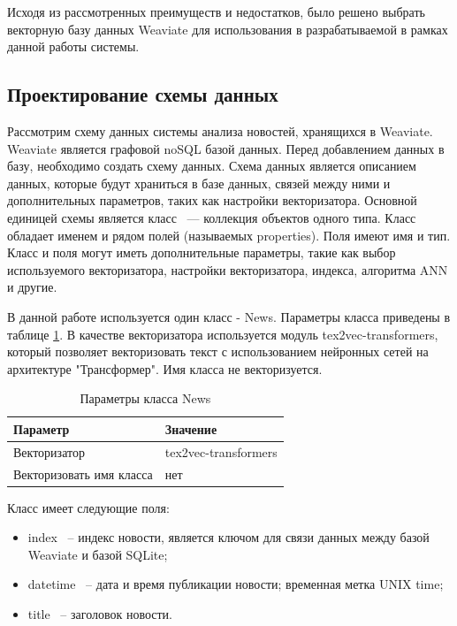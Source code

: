 Исходя из рассмотренных преимуществ и недостатков, было решено выбрать векторную базу данных Weaviate для использования в разрабатываемой в рамках данной работы системы.

\subsection{Проектирование схемы данных}
\label{chap:data-scheme}
Рассмотрим схему данных системы анализа новостей, хранящихся в Weaviate. Weaviate является графовой noSQL базой данных. Перед добавлением данных в базу, необходимо создать схему данных. Схема данных является описанием данных, которые будут храниться в базе данных, связей между ними и дополнительных параметров, таких как настройки векторизатора. Основной единицей схемы является класс ~--- коллекция объектов одного типа. Класс обладает именем и рядом полей (называемых properties). Поля имеют имя и тип. Класс и поля могут иметь дополнительные параметры, такие как выбор используемого векторизатора, настройки векторизатора, индекса, алгоритма ANN и другие.

В данной работе используется один класс - News. Параметры класса приведены в таблице \ref{tab:class-news-settings}. В качестве векторизатора используется модуль tex2vec-transformers, который позволяет векторизовать текст с использованием нейронных сетей на архитектуре "Трансформер". Имя класса не векторизуется.

\begin{table}[ht]
    \caption{Параметры класса News}
    \label{tab:class-news-settings}
    \begin{tabularx}{\textwidth}{|X|X|}
        \hline
        Параметр & Значение \\
        \hline
        Векторизатор & tex2vec-transformers \\
        \hline
        Векторизовать имя класса & нет \\
        \hline
    \end{tabularx}
\end{table}

Класс имеет следующие поля:
\begin{itemize}
    \item index ~-- индекс новости, является ключом для связи данных между базой Weaviate и базой SQLite;
    \item datetime ~-- дата и время публикации новости; временная метка UNIX time;
    \item title ~-- заголовок новости.
\end{itemize}

